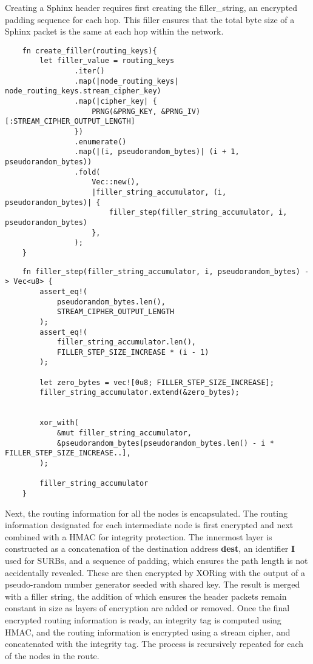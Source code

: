 Creating a Sphinx header requires first creating the filler\_string, an encrypted padding sequence for each hop. This filler ensures that the total byte size of a Sphinx packet is the same at each hop within the network. 


\begin{verbatim}
    fn create_filler(routing_keys){
        let filler_value = routing_keys
                .iter()
                .map(|node_routing_keys| node_routing_keys.stream_cipher_key)
                .map(|cipher_key| {
                    PRNG(&PRNG_KEY, &PRNG_IV)[:STREAM_CIPHER_OUTPUT_LENGTH]
                }) 
                .enumerate()
                .map(|(i, pseudorandom_bytes)| (i + 1, pseudorandom_bytes)) 
                .fold(
                    Vec::new(),
                    |filler_string_accumulator, (i, pseudorandom_bytes)| {
                        filler_step(filler_string_accumulator, i, pseudorandom_bytes)
                    },
                );
    }
\end{verbatim}


\begin{verbatim}
    fn filler_step(filler_string_accumulator, i, pseudorandom_bytes) -> Vec<u8> {
        assert_eq!(
            pseudorandom_bytes.len(),
            STREAM_CIPHER_OUTPUT_LENGTH
        );
        assert_eq!(
            filler_string_accumulator.len(),
            FILLER_STEP_SIZE_INCREASE * (i - 1)
        );
        
        let zero_bytes = vec![0u8; FILLER_STEP_SIZE_INCREASE];
        filler_string_accumulator.extend(&zero_bytes);

        
        xor_with(
            &mut filler_string_accumulator,
            &pseudorandom_bytes[pseudorandom_bytes.len() - i * FILLER_STEP_SIZE_INCREASE..],
        );

        filler_string_accumulator
    }
\end{verbatim}

\noindent Next, the routing information for all the nodes is encapsulated. The routing information designated for each intermediate node is first encrypted and next combined with a HMAC for integrity protection. The innermost layer is constructed as a concatenation of the destination address \textbf{dest}, an identifier \textbf{I} used for SURBs, and a sequence of padding, which ensures the path length is not accidentally revealed. These are then encrypted by XORing with the output of a pseudo-random number generator seeded with shared key.  
The result is merged with a filler string, the addition of which ensures the header packets remain constant in size as layers of encryption are added or removed. Once the final encrypted routing information is ready, an integrity tag is computed using HMAC, and the routing information is encrypted using a stream cipher, and concatenated with the integrity tag. The process is recursively repeated for each of the nodes in the route. 

